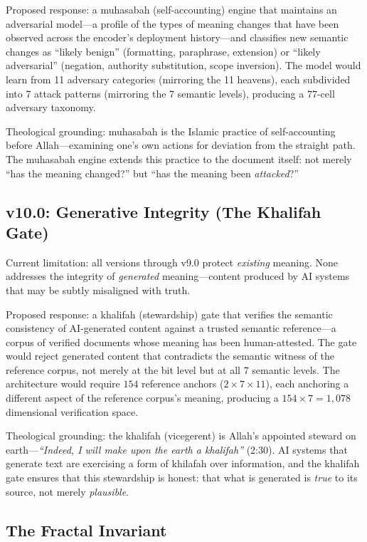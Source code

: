 \documentclass[11pt,a4paper]{article}
\begin{document}
Proposed response: a muhasabah (self-accounting) engine that maintains an adversarial model---a profile of the types of meaning changes that have been observed across the encoder's deployment history---and classifies new semantic changes as ``likely benign'' (formatting, paraphrase, extension) or ``likely adversarial'' (negation, authority substitution, scope inversion). The model would learn from 11 adversary categories (mirroring the 11 heavens), each subdivided into 7 attack patterns (mirroring the 7 semantic levels), producing a $77$-cell adversary taxonomy.

Theological grounding: muhasabah is the Islamic practice of self-accounting before Allah---examining one's own actions for deviation from the straight path. The muhasabah engine extends this practice to the document itself: not merely ``has the meaning changed?'' but ``has the meaning been \textit{attacked}?''

\subsection{v10.0: Generative Integrity (The Khalifah Gate)}

Current limitation: all versions through v9.0 protect \textit{existing} meaning. None addresses the integrity of \textit{generated} meaning---content produced by AI systems that may be subtly misaligned with truth.

Proposed response: a khalifah (stewardship) gate that verifies the semantic consistency of AI-generated content against a trusted semantic reference---a corpus of verified documents whose meaning has been human-attested. The gate would reject generated content that contradicts the semantic witness of the reference corpus, not merely at the bit level but at all 7 semantic levels. The architecture would require $154$ reference anchors ($2 \times 7 \times 11$), each anchoring a different aspect of the reference corpus's meaning, producing a $154 \times 7 = 1{,}078$ dimensional verification space.

Theological grounding: the khalifah (vicegerent) is Allah's appointed steward on earth---\textit{``Indeed, I will make upon the earth a khalifah''} (2:30). AI systems that generate text are exercising a form of khilafah over information, and the khalifah gate ensures that this stewardship is honest: that what is generated is \textit{true} to its source, not merely \textit{plausible}.

\subsection{The Fractal Invariant}
\end{document}
